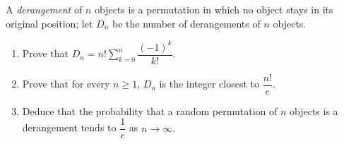 A \emph{derangement} of $n$ objects is a permutation in which no object stays in its original position; let $D_n$ be the number of derangements of $n$ objects.
\begin{enumerate}
\item[(a)] Prove that $D_n=n!\displaystyle\sum_{k=0}^{n}\dfrac{(-1)^k}{k!}$.
\item[(b)] Prove that for every $n\ge1$, $D_n$ is the integer closest to $\dfrac{n!}{e}$.
\item[(c)] Deduce that the probability that a random permutation of $n$ objects is a derangement tends to $\dfrac{1}{e}$ as $n\to\infty$.
\end{enumerate}
